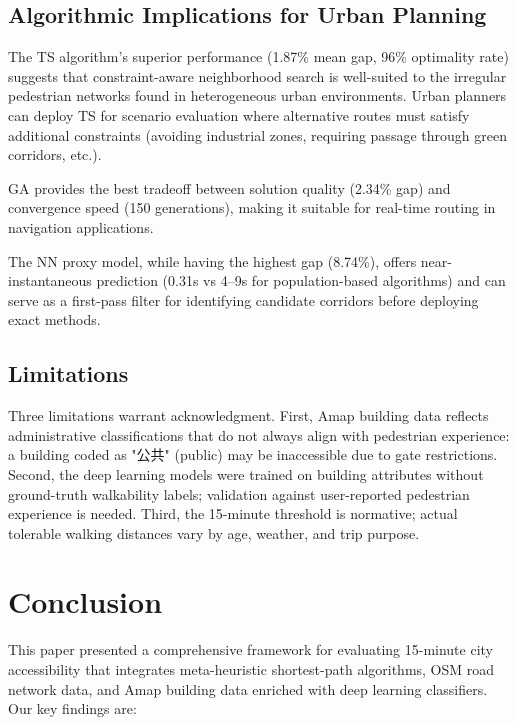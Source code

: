 \documentclass[journal]{IEEEtran}
\begin{document}
\subsection{Algorithmic Implications for Urban Planning}
The TS algorithm's superior performance (1.87\% mean gap, 96\% optimality rate) suggests that constraint-aware neighborhood search is well-suited to the irregular pedestrian networks found in heterogeneous urban environments. Urban planners can deploy TS for scenario evaluation where alternative routes must satisfy additional constraints (avoiding industrial zones, requiring passage through green corridors, etc.).

GA provides the best tradeoff between solution quality (2.34\% gap) and convergence speed (150 generations), making it suitable for real-time routing in navigation applications.

The NN proxy model, while having the highest gap (8.74\%), offers near-instantaneous prediction (0.31s vs 4--9s for population-based algorithms) and can serve as a first-pass filter for identifying candidate corridors before deploying exact methods.

\subsection{Limitations}
Three limitations warrant acknowledgment. First, Amap building data reflects administrative classifications that do not always align with pedestrian experience: a building coded as "公共" (public) may be inaccessible due to gate restrictions. Second, the deep learning models were trained on building attributes without ground-truth walkability labels; validation against user-reported pedestrian experience is needed. Third, the 15-minute threshold is normative; actual tolerable walking distances vary by age, weather, and trip purpose.

\section{Conclusion}
\label{sec:conclusion}

This paper presented a comprehensive framework for evaluating 15-minute city accessibility that integrates meta-heuristic shortest-path algorithms, OSM road network data, and Amap building data enriched with deep learning classifiers. Our key findings are:
\end{document}
